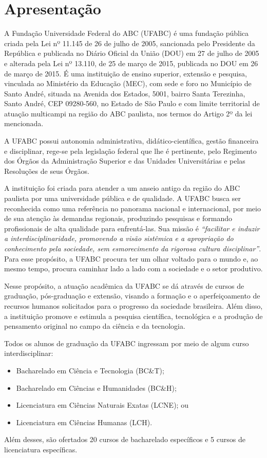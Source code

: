 \section{Apresentação}
\label{sec:apresentacao}

A Fundação Universidade Federal do ABC (UFABC) é uma fundação pública criada
pela Lei nº 11.145 de 26 de julho de 2005, sancionada pelo Presidente da
República e publicada no Diário Oficial da União (DOU) em 27 de julho de 2005 e
alterada pela Lei nº 13.110, de 25 de março de 2015, publicada no DOU em 26 de
março de 2015.
É uma instituição de ensino superior, extensão e pesquisa, vinculada ao
Ministério da Educação (MEC), com sede e foro no Município de Santo André,
situada na Avenida dos Estados, 5001, bairro Santa Terezinha, Santo André, CEP
09280-560, no Estado de São Paulo e com limite territorial de atuação
multicampi na região do ABC paulista, nos termos do Artigo 2º da lei
mencionada.

A UFABC possui autonomia administrativa, didático-científica, gestão financeira
e disciplinar, rege-se pela legislação federal que lhe é pertinente, pelo
Regimento dos Órgãos da Administração Superior e das Unidades Universitárias e
pelas Resoluções de seus Órgãos.

A instituição foi criada para atender a um anseio antigo da região do ABC
paulista por uma universidade pública e de qualidade.
A UFABC busca ser reconhecida como uma referência no panorama nacional e
internacional, por meio de sua atenção às demandas regionais, produzindo
pesquisas e formando profissionais de alta qualidade para enfrentá-las.
Sua missão é \textit{``facilitar e induzir a interdisciplinaridade, promovendo
a visão sistêmica e a apropriação do conhecimento pela sociedade, sem
esmorecimento da rigorosa cultura disciplinar''}.
Para esse propósito, a UFABC procura ter um olhar voltado para o mundo e, ao
mesmo tempo, procura caminhar lado a lado com a sociedade e o setor produtivo.

Nesse propósito, a atuação acadêmica da UFABC se dá através de cursos de
graduação, pós-graduação e extensão, visando a formação e o aperfeiçoamento de
recursos humanos solicitados para o progresso da sociedade brasileira.
Além disso, a instituição promove e estimula a pesquisa científica, tecnológica
e a produção de pensamento original no campo da ciência e da tecnologia.

Todos os alunos de graduação da UFABC ingressam por meio de algum curso
interdisciplinar:
\begin{itemize}
    \item Bacharelado em Ciência e Tecnologia (BC\&T);
    \item Bacharelado em Ciências e Humanidades (BC\&H);
    \item Licenciatura em Ciências Naturais Exatas (LCNE); ou
    \item Licenciatura em Ciências Humanas (LCH).
\end{itemize}
Além desses, são ofertados 20 cursos de bacharelado específicos e 5 cursos de
licenciatura específicas.



